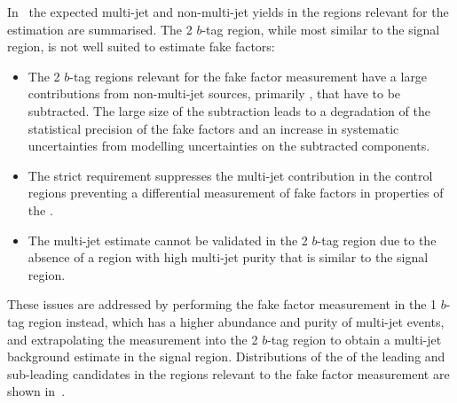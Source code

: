 In~ the expected multi-jet and non-multi-jet
yields in the regions relevant for the \faketauhadvis estimation are
summarised. The 2 $b$-tag region, while most similar to the signal
region, is not well suited to estimate fake factors:
\begin{itemize}

\item The 2 $b$-tag regions relevant for the fake factor measurement
  have a large contributions from non-multi-jet sources, primarily
  \ttbarFakes, that have to be subtracted. The large size of the
  subtraction leads to a degradation of the statistical precision of
  the fake factors and an increase in systematic uncertainties from
  modelling uncertainties on the subtracted components.

\item The strict \btag requirement suppresses the multi-jet
  contribution in the control regions preventing a differential
  measurement of fake factors in properties of the \tauhadvis.

\item The multi-jet estimate cannot be validated in the 2 $b$-tag
  region due to the absence of a region with high multi-jet purity
  that is similar to the signal region.

\end{itemize}
These issues are addressed by performing the fake factor measurement
in the 1 $b$-tag region instead, which has a higher abundance and
purity of multi-jet events, and extrapolating the measurement into the
2 $b$-tag region to obtain a multi-jet background estimate in the
signal region. Distributions of the \pT of the leading and sub-leading
\tauhadvis candidates in the regions relevant to the fake factor
measurement are shown in~.

